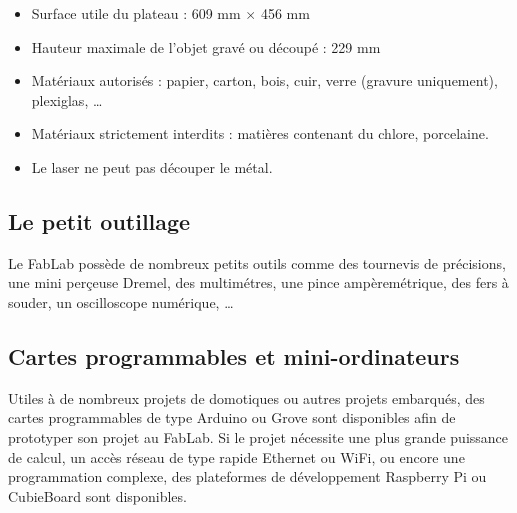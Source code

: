 \begin{itemize}
  \item Surface utile du plateau : 609 mm $\times$ 456 mm
  \item Hauteur maximale de l'objet gravé ou découpé : 229 mm
  \item Matériaux autorisés : papier, carton, bois, cuir, verre (gravure uniquement), plexiglas, \dots
  \item Matériaux strictement interdits : matières contenant du chlore, porcelaine.
  \item Le laser ne peut pas découper le métal.
\end{itemize}

\subsection{Le petit outillage}
Le FabLab possède de nombreux petits outils comme des tournevis de précisions, une mini perçeuse Dremel, des multimétres, une pince ampèremétrique, des fers à souder, un oscilloscope numérique, \dots

\subsection{Cartes programmables et mini-ordinateurs}
Utiles à de nombreux projets de domotiques ou autres projets embarqués, des cartes programmables de type Arduino ou Grove sont disponibles afin de prototyper son projet au FabLab. Si le projet nécessite une plus grande puissance de calcul, un accès réseau de type rapide Ethernet ou WiFi, ou encore une programmation complexe, des plateformes de développement Raspberry Pi ou CubieBoard sont disponibles.
